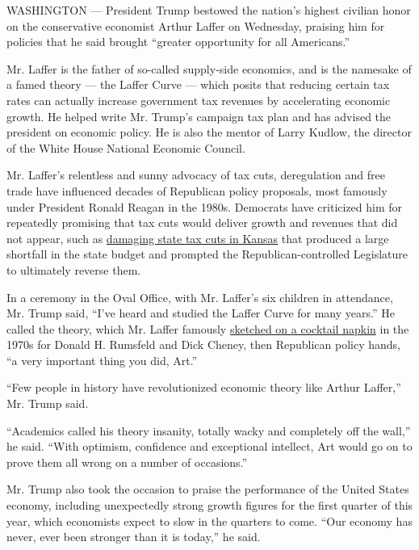 WASHINGTON --- President Trump bestowed the nation's highest civilian
honor on the conservative economist Arthur Laffer on Wednesday, praising
him for policies that he said brought ``greater opportunity for all
Americans.''

Mr. Laffer is the father of so-called supply-side economics, and is the
namesake of a famed theory --- the Laffer Curve --- which posits that
reducing certain tax rates can actually increase government tax revenues
by accelerating economic growth. He helped write Mr. Trump's campaign
tax plan and has advised the president on economic policy. He is also
the mentor of Larry Kudlow, the director of the White House National
Economic Council.

Mr. Laffer's relentless and sunny advocacy of tax cuts, deregulation and
free trade have influenced decades of Republican policy proposals, most
famously under President Ronald Reagan in the 1980s. Democrats have
criticized him for repeatedly promising that tax cuts would deliver
growth and revenues that did not appear, such as
\href{https://www.npr.org/2017/10/25/560040131/as-trump-proposes-tax-cuts-kansas-deals-with-aftermath-of-experiment}{damaging
state tax cuts in Kansas} that produced a large shortfall in the state
budget and prompted the Republican-controlled Legislature to ultimately
reverse them.

In a ceremony in the Oval Office, with Mr. Laffer's six children in
attendance, Mr. Trump said, ``I've heard and studied the Laffer Curve
for many years.'' He called the theory, which Mr. Laffer famously
\href{https://www.nytimes3xbfgragh.onion/2017/10/13/us/politics/arthur-laffer-napkin-tax-curve.html}{sketched
on a cocktail napkin} in the 1970s for Donald H. Rumsfeld and Dick
Cheney, then Republican policy hands, ``a very important thing you did,
Art.''

``Few people in history have revolutionized economic theory like Arthur
Laffer,'' Mr. Trump said.

``Academics called his theory insanity, totally wacky and completely off
the wall,'' he said. ``With optimism, confidence and exceptional
intellect, Art would go on to prove them all wrong on a number of
occasions.''

Mr. Trump also took the occasion to praise the performance of the United
States economy, including unexpectedly strong growth figures for the
first quarter of this year, which economists expect to slow in the
quarters to come. ``Our economy has never, ever been stronger than it is
today,'' he said.

